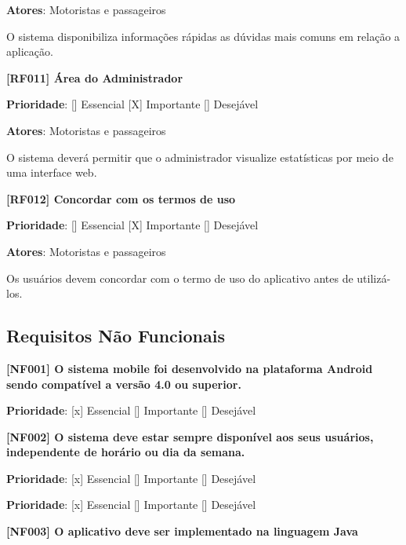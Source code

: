 \textbf{Atores}: Motoristas e passageiros

O sistema disponibiliza informações rápidas as dúvidas mais comuns em relação a aplicação.

\textbf{[RF011] Área do Administrador}

\textbf{Prioridade}:      [] Essencial        [X] Importante     [] Desejável 

\textbf{Atores}: Motoristas e passageiros

O sistema deverá permitir que o administrador visualize
estatísticas por meio de uma interface web.

\textbf{[RF012] Concordar com os termos de uso} 

\textbf{Prioridade}:      [] Essencial        [X] Importante     [] Desejável 

\textbf{Atores}: Motoristas e passageiros

Os usuários devem concordar com o termo de uso do aplicativo antes de utilizá-los.


\subsection{Requisitos Não Funcionais}

\textbf{[NF001] O sistema mobile foi desenvolvido na plataforma Android sendo compatível a versão 4.0 ou superior. %
}

\textbf{Prioridade}:      [x] Essencial        [] Importante     [] Desejável 



\textbf{[NF002] O sistema deve estar sempre disponível  aos seus usuários, independente de horário ou dia da semana. %
}

\textbf{Prioridade}:      [x] Essencial        [] Importante     [] Desejável 



\textbf{Prioridade}:      [x] Essencial        [] Importante     [] Desejável 




\textbf{[NF003] O aplicativo deve ser implementado na linguagem Java}


